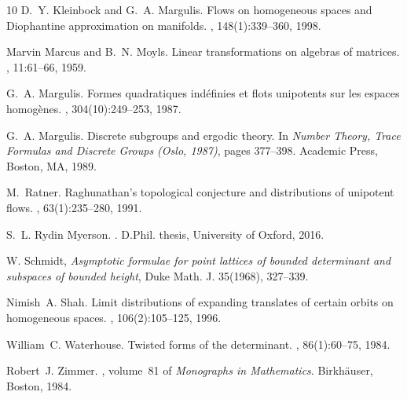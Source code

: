 \documentclass[reqno,11pt]{amsart}
\numberwithin{equation}{section}
\theoremstyle{definition}
\theoremstyle{remark}
\begin{document}
\begin{thebibliography}{10}
D.~Y. Kleinbock and G.~A. Margulis.
\newblock Flows on homogeneous spaces and {D}iophantine approximation on manifolds.
, 148(1):339--360, 1998.


Marvin Marcus and B.~N. Moyls.
\newblock Linear transformations on algebras of matrices.
, 11:61--66, 1959.

G.~A. Margulis.
\newblock Formes quadratiques ind{\'e}finies et flots unipotents sur les espaces homog{\`e}nes.
, 304(10):249--253, 1987.

G.~A. Margulis.
\newblock Discrete subgroups and ergodic theory.
\newblock In {\em Number Theory, Trace Formulas and Discrete Groups ({O}slo, 1987)}, pages 377--398. Academic Press, Boston, MA, 1989.

M.~Ratner.
\newblock Raghunathan's topological conjecture and distributions of unipotent flows.
, 63(1):235--280, 1991.

S.~L. Rydin Myerson.
.
\newblock D.Phil. thesis, University of Oxford, 2016.

W. Schmidt, \emph{Asymptotic formulae for point lattices of bounded determinant and
subspaces of bounded height}, Duke Math. J. 35(1968), 327–339.

Nimish~A. Shah.
\newblock Limit distributions of expanding translates of certain orbits on homogeneous spaces.
, 106(2):105--125, 1996.

William~C. Waterhouse.
\newblock Twisted forms of the determinant.
, 86(1):60--75, 1984.

Robert~J. Zimmer.
, volume~81 of {\em Monographs in Mathematics}.
\newblock Birkh\"auser, Boston, 1984.



\end{thebibliography}
\end{document}
